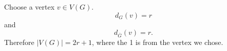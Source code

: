 Choose a vertex $v \in V\left(G\right)$. 
\begin{equation}
d_G\left(v\right) = r 
\end{equation} 
and \begin{equation}
d_{\bar{G}}\left(v\right) = r. 
 \end{equation}
Therefore $|V\left(G\right)| = 2r + 1$, where the 1 is from the vertex we chose.

